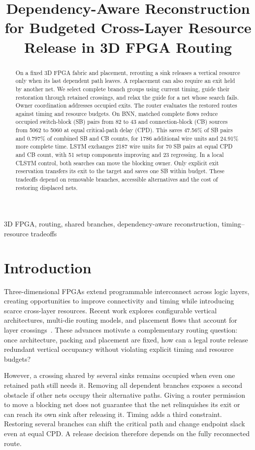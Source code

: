 \documentclass[conference,10pt]{IEEEtran}
\title{Dependency-Aware Reconstruction for Budgeted Cross-Layer Resource Release in 3D FPGA Routing}
\author{\IEEEauthorblockN{Anonymous submission}}
\begin{document}
\maketitle
\begin{abstract}
On a fixed 3D FPGA fabric and placement, rerouting a sink releases a vertical resource only when its last dependent path leaves. A replacement can also require an exit held by another net. We select complete branch groups using current timing, guide their restoration through retained crossings, and relax the guide for a net whose search fails. Owner coordination addresses occupied exits. The router evaluates the restored routes against timing and resource budgets. On BNN, matched complete flows reduce occupied switch-block (SB) pairs from 82 to 43 and connection-block (CB) sources from 5062 to 5060 at equal critical-path delay (CPD). This saves 47.56\% of SB pairs and 0.797\% of combined SB and CB counts, for 1786 additional wire units and 24.91\% more complete time. LSTM exchanges 2187 wire units for 70 SB pairs at equal CPD and CB count, with 51 setup components improving and 23 regressing. In a local CLSTM control, both searches can move the blocking owner. Only explicit exit reservation transfers its exit to the target and saves one SB within budget. These tradeoffs depend on removable branches, accessible alternatives and the cost of restoring displaced nets.
\end{abstract}
\begin{IEEEkeywords}
3D FPGA, routing, shared branches, dependency-aware reconstruction, timing--resource tradeoffs
\end{IEEEkeywords}

\section{Introduction}
Three-dimensional FPGAs extend programmable interconnect across logic layers, creating opportunities to improve connectivity and timing while introducing scarce cross-layer resources. Recent work explores configurable vertical architectures, multi-die routing models, and placement flows that account for layer crossings~\cite{lazagna,multidie,flatland}. These advances motivate a complementary routing question: once architecture, packing and placement are fixed, how can a legal route release redundant vertical occupancy without violating explicit timing and resource budgets?

However, a crossing shared by several sinks remains occupied when even one retained path still needs it. Removing all dependent branches exposes a second obstacle if other nets occupy their alternative paths. Giving a router permission to move a blocking net does not guarantee that the net relinquishes its exit or can reach its own sink after releasing it. Timing adds a third constraint. Restoring several branches can shift the critical path and change endpoint slack even at equal CPD. A release decision therefore depends on the fully reconnected route.
\end{document}
